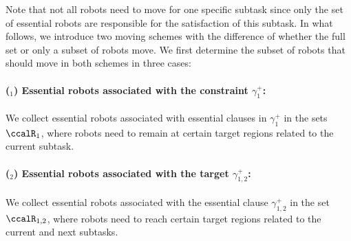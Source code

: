 \documentclass[Afour,sageh,times]{sagej}
\newcounter{mycounter}
\begin{document}
{ Note that not all robots need to move for one specific subtask since only the set of essential robots are responsible for the satisfaction of this subtask. In what follows, we introduce two moving schemes with the difference of whether the full set or only a subset of robots move.   We first determine the subset of robots that should move in both schemes in three cases:
 \paragraph{($_1$) Essential robots associated with the constraint $\gamma_1^+$:}\label{sec:essential_a} We collect essential robots associated with essential clauses in $\gamma_{1}^{+}$ in the sets $\ccalR_{1}$,  where robots need to remain at certain target regions related to the current subtask.
 \paragraph{($_2$) Essential robots associated with the target $\gamma_{1,2}^{+}$:}\label{sec:essential_b}  We collect essential robots associated with the essential clause  $\gamma_{1,2}^{+}$ in the set $\ccalR_{1,2}$, where  robots need to reach certain target regions related to the current and next subtasks.
}
\end{document}

